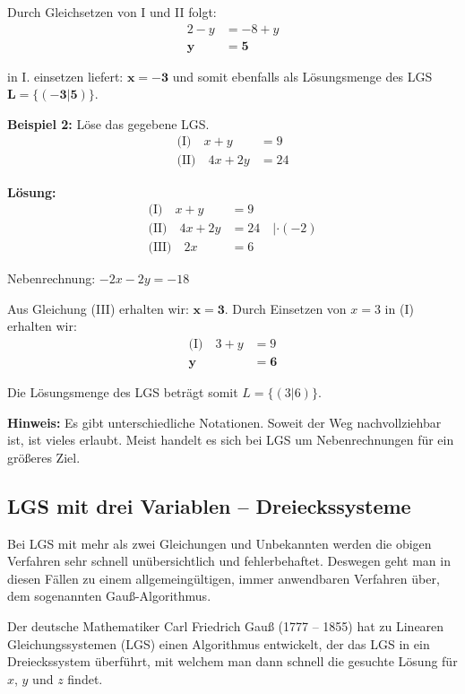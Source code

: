 \documentclass{article}
\begin{document}
Durch Gleichsetzen von I und II folgt:
\begin{align}
2 - y &= -8 + y\\
\mathbf{y} &= \mathbf{5}
\end{align}

in I. einsetzen liefert: $\mathbf{x = -3}$ und somit ebenfalls als Lösungsmenge des LGS $\mathbf{L = \{(-3|5)\}}$.

\textbf{Beispiel 2:} Löse das gegebene LGS.
\begin{align}
\text{(I)} \quad x + y &= 9\\
\text{(II)} \quad 4x + 2y &= 24
\end{align}

\textbf{Lösung:}
\begin{align}
\text{(I)} \quad x + y &= 9\\
\text{(II)} \quad 4x + 2y &= 24 \quad |\cdot (-2)\\
\text{(III)} \quad 2x &= 6
\end{align}

Nebenrechnung: $-2x - 2y = -18$

Aus Gleichung (III) erhalten wir: $\mathbf{x = 3}$. Durch Einsetzen von $x = 3$ in (I) erhalten wir:
\begin{align}
\text{(I)} \quad 3 + y &= 9\\
\mathbf{y} &= \mathbf{6}
\end{align}

Die Lösungsmenge des LGS beträgt somit $L = \{(3|6)\}$.

\textbf{Hinweis:} Es gibt unterschiedliche Notationen. Soweit der Weg nachvollziehbar ist, ist vieles erlaubt. Meist handelt es sich bei LGS um Nebenrechnungen für ein größeres Ziel.

\newpage

\subsection{LGS mit drei Variablen – Dreieckssysteme}

Bei LGS mit mehr als zwei Gleichungen und Unbekannten werden die obigen Verfahren sehr schnell unübersichtlich und fehlerbehaftet. Deswegen geht man in diesen Fällen zu einem allgemeingültigen, immer anwendbaren Verfahren über, dem sogenannten Gauß-Algorithmus.

Der deutsche Mathematiker Carl Friedrich Gauß (1777 – 1855) hat zu Linearen Gleichungssystemen (LGS) einen Algorithmus entwickelt, der das LGS in ein Dreieckssystem überführt, mit welchem man dann schnell die gesuchte Lösung für $x$, $y$ und $z$ findet.
\end{document}
